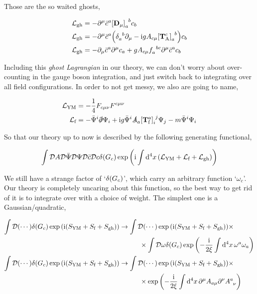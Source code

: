 Those are the so waited ghosts,

\begin{align}
    \mathcal L_{\textnormal{gh}}&=-\partial^\mu\bar c^a\tensor{\qty[\vb D_\mu]}{_a^b}c_b\nonumber\\
    \mathcal L_{\textnormal{gh}}&=-\partial^\mu\bar c^a\qty(\tensor{\delta}{_a^b}\partial_\mu -\im g A_{c\mu}\tensor{\qty[\vb T^c_{\textnormal A}]}{_a^b})c_b\nonumber\\
    \mathcal L_{\textnormal{gh}}&=-\partial_\mu\bar c^a\partial^\mu c_a+g A_{c\mu}\tensor{f}{_a^b^c}\partial^\mu \bar c^ac_b\nonumber
\end{align}

Including this \textit{ghost Lagrangian} in our theory, we can don't worry about over-counting in the gauge boson integration, and just switch back to integrating over all field configurations. In order to not get messy, we also are going to name,

\begin{align}
    \mathcal L_{\textnormal{YM}}&=-\frac14F_{c\mu\nu}F^{c\mu\nu}\nonumber\\
    \mathcal L_{\textnormal{f}}&=-\bar{\Psi}^i\slashed\partial\Psi_i+\im g\bar{\Psi}^i\slashed A_a\tensor{\qty[\vb T^a_{\textnormal f}]}{_i^j}\Psi_j-m\bar\Psi^i\Psi_i\nonumber
\end{align}

So that our theory up to now is described by the following generating functional,

\begin{align}
    \int\mathcal D A\mathcal D \bar\Psi\mathcal D \Psi\mathcal D \bar c\mathcal D c\delta\qty(G_c)\exp\qty(\textnormal{i}\int\dd[4]{x}\qty(\mathcal L_{\textnormal{YM}}+\mathcal L_{\textnormal{f}}+\mathcal L_{\textnormal{gh}}))\nonumber
\end{align}

We still have a strange factor of `$\delta\qty(G_c)$', which carry an arbitrary function `$\omega_c$'. Our theory is completely uncaring about this function, so the best way to get rid of it is to integrate over with a choice of weight. The simplest one is a Gaussian/quadratic,

\begin{align}
    \int\Dd\qty(\cdots)\delta\qty(G_c)\exp\qty(\im\qty(S_{\textnormal{YM}}+S_{\textnormal{f}}+S_{\textnormal{gh}}))&\rightarrow\int\Dd\qty(\cdots)\exp\qty(\im\qty(S_{\textnormal{YM}}+S_{\textnormal{f}}+S_{\textnormal{gh}}))\times\nonumber\\&\quad\quad\quad\times\int\Dd{\omega}\delta\qty(G_c)\exp\qty(-\frac{\im}{2\xi}\int\dd[4]{x}\omega^a\omega_a)\nonumber\\
    \int\Dd\qty(\cdots)\delta\qty(G_c)\exp\qty(\im\qty(S_{\textnormal{YM}}+S_{\textnormal{f}}+S_{\textnormal{gh}}))&\rightarrow\int\Dd\qty(\cdots)\exp\qty(\im\qty(S_{\textnormal{YM}}+S_{\textnormal{f}}+S_{\textnormal{gh}}))\times\nonumber\\&\quad\quad\quad\times\exp\qty(-\frac{\im}{2\xi}\int\dd[4]{x}\partial^\mu A_{a\mu}\partial^\nu \tensor{A}{^a_\nu})\nonumber
\end{align}

